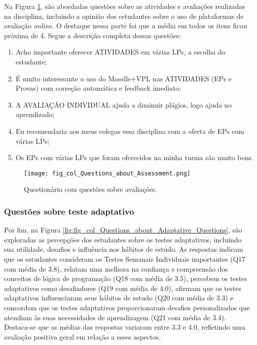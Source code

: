 Na Figura \ref{fig:fig_col_Questions_about_Assessment}, são abordadas questões sobre as atividades e avaliações realizadas na disciplina, incluindo a opinião dos estudantes sobre o uso de plataformas de avaliação \textit{online}. O destaque nessa parte foi que a média em todos os itens ficou próxima de 4. Segue a descrição completa dessas questões:

\begin{enumerate}[label=\textbf{Q\arabic*.}, itemsep=0pt, parsep=0pt, topsep=0pt, leftmargin=*, before=\ttfamily, after=\normalfont]
    \fontsize{9}{11}\selectfont
    \setcounter{enumi}{11} %
    \item Acho importante oferecer ATIVIDADES em várias LPs, a escolha do estudante;
    \item É muito interessante o uso do Moodle+VPL nas ATIVIDADES (EPs e Provas) com correção automática e feedback imediato;
    \item A AVALIAÇÃO INDIVIDUAL ajuda a diminuir plágios, logo ajuda no aprendizado;
    \item Eu recomendaria aos meus colegas essa disciplina com a oferta de EPs com várias LPs;
    \item Os EPs com várias LPs que foram oferecidos na minha turma são muito bons.
\end{enumerate}

\begin{figure}[!ht]
    \centering
    \texttt{[image: fig\_col\_Questions\_about\_Assessment.png]}
     \caption{Questionário com questões sobre avaliações.}
  \label{fig:fig_col_Questions_about_Assessment}
\end{figure}

\subsubsection{Questões sobre teste adaptativo}

Por fim, na Figura \ref{fig:fig_col_Questions_about_Adaptative_Questions}, são exploradas as percepções dos estudantes sobre os testes adaptativos, incluindo sua utilidade, desafios e influência nos hábitos de estudo. As respostas indicam que os estudantes consideram os Testes Semanais Individuais importantes (Q17 com média de 3.8), relatam uma melhora na confiança e compreensão dos conceitos de lógica de programação (Q18 com média de 3.5), percebem os testes adaptativos como desafiadores (Q19 com média de 4.0), afirmam que os testes adaptativos influenciaram seus hábitos de estudo (Q20 com média de 3.3) e concordam que os testes adaptativos proporcionaram desafios personalizados que atendiam às suas necessidades de aprendizagem (Q21 com média de 3.4). Destaca-se que as médias das respostas variaram entre 3.3 e 4.0, refletindo uma avaliação positiva geral em relação a esses aspectos. 

